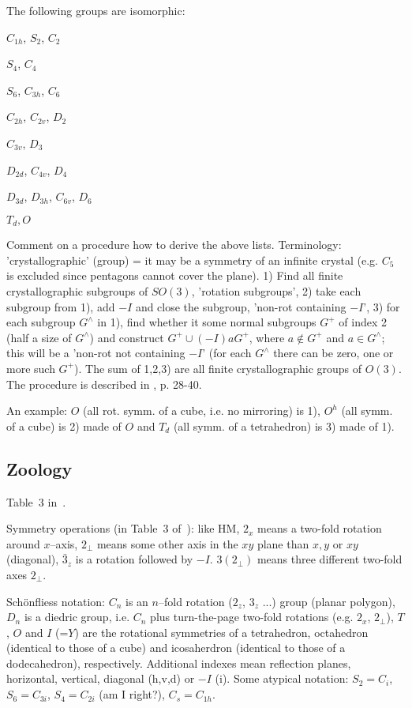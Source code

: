 The following groups are isomorphic: 

$C_{1h}$, $S_2$, $C_2$

$S_4$, $C_4$

$S_6$, $C_{3h}$, $C_6$

$C_{2h}$, $C_{2v}$, $D_2$

$C_{3v}$, $D_3$

$D_{2d}$, $C_{4v}$, $D_4$

$D_{3d}$, $D_{3h}$, $C_{6v}$, $D_6$

$T_d, O$





Comment on a procedure how to derive the above lists. Terminology:
'crystallographic' (group) = it may be a symmetry of an infinite
crystal (e.g. $C_5$ is excluded since pentagons cannot cover the
plane). 1) Find all finite crystallographic subgroups of $SO(3)$,
'rotation subgroups', 2) take each subgroup from 1), add $-I$ and
close the subgroup, 'non-rot containing $-I$', 3) for each subgroup
$G^\wedge$ in 1), find whether it some normal subgroups $G^+$ of index
2 (half a size of $G^\wedge$) and construct $G^+\cup (-I)aG^+$, where
$a\notin G^+$ and $a\in G^\wedge$; this will be a 'non-rot not
containing $-I$' (for each $G^\wedge$ there can be zero, one or more
such $G^+$). The sum of 1,2,3) are all finite crystallographic groups
of $O(3)$.  The procedure is described in \cite{sternberg}, p. 28-40.

An example: $O$ (all rot. symm. of a cube, i.e. no mirroring) is 1), $O^h$
(all symm. of a cube) is 2) made of $O$ and $T_d$ (all symm. of a tetrahedron)
is 3) made of 1). 



\subsection{Zoology}

Table~3 in~\cite{birss}.

Symmetry operations (in Table~3 of~\cite{birss}): like HM, $2_x$ means a
two-fold rotation around $x$--axis, $2_\perp$ means some other axis in the
$xy$ plane than $x,y$ or $xy$ (diagonal), $\bar{3}_z$ is a rotation followed
by $-I$. $3(2_\perp)$ means three different two-fold axes $2_\perp$.

Sch\"onfliess notation: $C_n$ is an $n$--fold rotation ($2_z$, $3_z$ ...)
group (planar polygon), $D_n$ is a diedric group, i.e. $C_n$ plus
turn-the-page two-fold rotations (e.g. $2_x$, $2_\perp$), $T$, $O$ and $I$
(=$Y$) are the rotational symmetries of a tetrahedron, octahedron (identical
to those of a cube) and icosaherdron (identical to those of a dodecahedron),
respectively. Additional indexes mean reflection planes, horizontal, vertical,
diagonal (h,v,d) or $-I$ (i). Some atypical notation: $S_2=C_i$,
$S_6=C_{3i}$, $S_4=C_{2i}$ (am I right?), $C_s=C_{1h}$.

